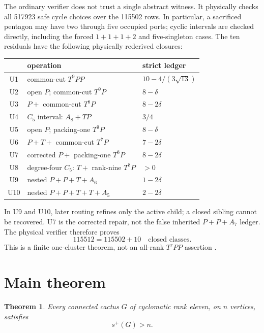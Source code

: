 \documentclass[11pt]{article}
\newtheorem{theorem}{Theorem}[section]
\theoremstyle{remark}
\newcommand{\spE}{s^+}
\begin{document}
The ordinary verifier does not trust a single abstract witness.  It physically
checks all 517923 safe cycle choices over the 115502 rows.  In particular, a
sacrificed pentagon may have two through five occupied ports; cyclic intervals
are checked directly, including the forced $1+1+1+2$ and five-singleton cases.
The ten residuals have the following physically rederived closures:
\begin{center}
\small
\begin{tabular}{cll}
\toprule
&operation&strict ledger\\
\midrule
U1&common-cut $T^9PP$&$10-4/(3\sqrt{13})$\\
U2&open $P$; common-cut $T^9P$&$8-\delta$\\
U3&$P+$ common-cut $T^8P$&$8-2\delta$\\
U4&$C_5$ interval: $A_8+TP$&$3/4$\\
U5&open $P$; packing-one $T^9P$&$8-\delta$\\
U6&$P+T+$ common-cut $T^7P$&$7-2\delta$\\
U7&corrected $P+$ packing-one $T^8P$&$8-2\delta$\\
U8&degree-four $C_5$: $T+$ rank-nine $T^8P$&$>0$\\
U9&nested $P+P+T+A_6$&$1-2\delta$\\
U10&nested $P+P+T+T+A_5$&$2-2\delta$\\
\bottomrule
\end{tabular}
\end{center}
In U9 and U10, later routing refines only the active child; a closed sibling
cannot be recovered.  U7 is the corrected repair, not the false inherited
$P+P+A_7$ ledger.  The physical verifier therefore proves
\begin{equation}\label{eq:115512}
 \boxed{115512=115502+10\quad\text{closed classes}.}
\end{equation}
This is a finite one-cluster theorem, not an all-rank $T^rPP$ assertion
\cite{FullyShared}.

\section{Main theorem}

\begin{theorem}\label{thm:main}
Every connected cactus $G$ of cyclomatic rank eleven, on $n$ vertices,
satisfies
\[
 \boxed{\spE(G)>n}.
\]
\end{theorem}
\end{document}

